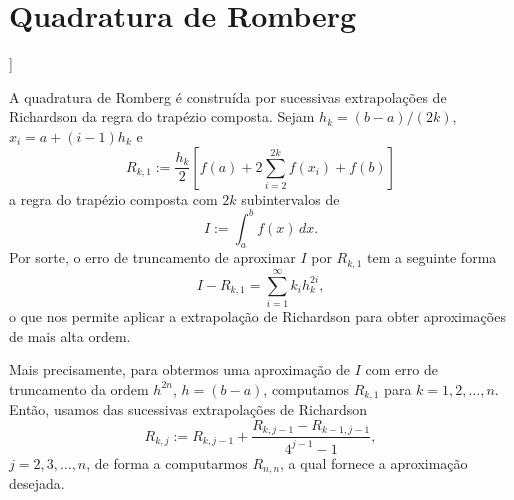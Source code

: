 \section{Quadratura de Romberg}\label{cap_integr_sec_Romberg}

\begin{flushleft}
  [[tag:revisar]]
\end{flushleft}

A quadratura de Romberg é construída por sucessivas extrapolações de Richardson da regra do trapézio composta. Sejam $h_k = (b-a)/(2k)$, $x_i = a + (i-1)h_k$ e
\begin{equation}
  R_{k,1} := \frac{h_k}{2}\left[f(a) + 2\sum_{i=2}^{2k}f(x_i) + f(b)\right]
\end{equation}
a regra do trapézio composta com $2k$ subintervalos de
\begin{equation}
  I := \int_a^b f(x)\,dx.
\end{equation}
Por sorte, o erro de truncamento de aproximar $I$ por $R_{k,1}$ tem a seguinte forma
\begin{equation}
  I - R_{k,1} = \sum_{i=1}^\infty k_ih_k^{2i},
\end{equation}
o que nos permite aplicar a extrapolação de Richardson para obter aproximações de mais alta ordem.

Mais precisamente, para obtermos uma aproximação de $I$ com erro de truncamento da ordem $h^{2n}$, $h=(b-a)$, computamos $R_{k,1}$ para $k=1, 2, \dotsc, n$. Então, usamos das sucessivas extrapolações de Richardson
\begin{equation}
  R_{k,j} := R_{k,j-1} + \frac{R_{k,j-1}-R_{k-1,j-1}}{4^{j-1}-1},
\end{equation}
$j=2, 3, \dotsc, n$, de forma a computarmos $R_{n,n}$, a qual fornece a aproximação desejada.

